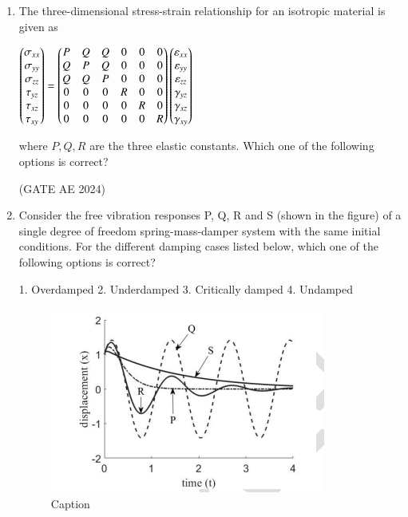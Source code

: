 \documentclass[journal,12pt,onecolumn]{IEEEtran}
\theoremstyle{remark}
\begin{document}
\begin{enumerate}
\item
The three-dimensional stress-strain relationship for an isotropic material is given as  

$
\myvec{
\sigma_{xx} \\
\sigma_{yy} \\
\sigma_{zz} \\
\tau_{yz} \\
\tau_{xz} \\
\tau_{xy}
}
=
\myvec{
P & Q & Q & 0 & 0 & 0 \\
Q & P & Q & 0 & 0 & 0 \\
Q & Q & P & 0 & 0 & 0 \\
0 & 0 & 0 & R & 0 & 0 \\
0 & 0 & 0 & 0 & R & 0 \\
0 & 0 & 0 & 0 & 0 & R
}
\myvec{
\varepsilon_{xx} \\
\varepsilon_{yy} \\
\varepsilon_{zz} \\
\gamma_{yz} \\
\gamma_{xz} \\
\gamma_{xy}
}
$

where $P, Q, R$ are the three elastic constants. Which one of the following options is correct?  


\begin{enumerate}
\end{enumerate}
\hfill(GATE AE 2024)

\item 
Consider the free vibration responses P, Q, R and S (shown in the figure) of a single degree of freedom spring-mass-damper system with the same initial conditions. For the different damping cases listed below, which one of the following options is correct?  

1. Overdamped  
2. Underdamped  
3. Critically damped  
4. Undamped  

\begin{figure}[H]
    \centering
    \includegraphics[width=0.5\columnwidth]{figs/Screenshot from 2025-08-23 15-17-56.png}
    \caption{Caption}
    \label{fig:placeholder}
\end{figure}


\end{enumerate}
\end{document}
